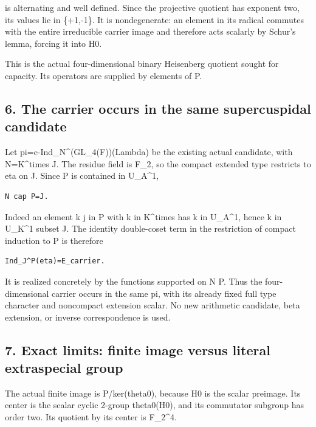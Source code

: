 is alternating and well defined. Since the projective quotient has
exponent two, its values lie in \{+1,-1\}. It is nondegenerate: an
element in its radical commutes with the entire irreducible carrier
image and therefore acts scalarly by Schur's lemma, forcing it into H0.

This is the actual four-dimensional binary Heisenberg quotient sought
for capacity. Its operators are supplied by elements of P.

\hypertarget{rank~4-the-carrier-occurs-in-the-same-supercuspidal-candidate}{%
\subsection{6. The carrier occurs in the same supercuspidal
candidate}\label{rank~4-the-carrier-occurs-in-the-same-supercuspidal-candidate}}

Let pi=c-Ind\_N\^{}(GL\_4(F))(Lambda) be the existing actual candidate,
with N=K\^{}times J. The residue field is F\_2, so the compact extended
type restricts to eta on J. Since P is contained in U\_A\^{}1,

\begin{Verbatim}[fontsize=\small,breaklines=true,breakanywhere=true]
N cap P=J.
\end{Verbatim}

Indeed an element k j in P with k in K\^{}times has k in U\_A\^{}1,
hence k in U\_K\^{}1 subset J. The identity double-coset term in the
restriction of compact induction to P is therefore

\begin{Verbatim}[fontsize=\small,breaklines=true,breakanywhere=true]
Ind_J^P(eta)=E_carrier.
\end{Verbatim}

It is realized concretely by the functions supported on N P. Thus the
four-dimensional carrier occurs in the same pi, with its already fixed
full type character and noncompact extension scalar. No new arithmetic
candidate, beta extension, or inverse correspondence is used.

\hypertarget{rank~4-exact-limits-finite-image-versus-literal-extraspecial-group}{%
\subsection{7. Exact limits: finite image versus literal extraspecial
group}\label{rank~4-exact-limits-finite-image-versus-literal-extraspecial-group}}

The actual finite image is P/ker(theta0), because H0 is the scalar
preimage. Its center is the scalar cyclic 2-group theta0(H0), and its
commutator subgroup has order two. Its quotient by its center is
F\_2\^{}4.

